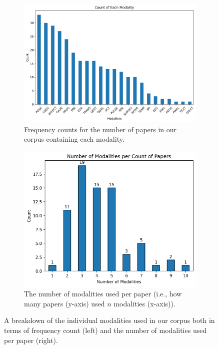\documentclass[manuscript,screen,review]{acmart}
\begin{document}
\begin{figure}[htbp]
    \centering    
    \begin{subfigure}[b]{0.45\textwidth}
        \includegraphics[width=\textwidth]{img/statistical_imgs/modalities.png}
        \caption{Frequency counts for the number of papers in our corpus containing each modality.}
        \label{fig:modalities_freq}
    \end{subfigure}
    \hfill
    \begin{subfigure}[b]{0.45\textwidth}
        \includegraphics[width=\textwidth]{img/statistical_imgs/number of modalities per count of papers.png}
        \caption{The number of modalities used per paper (i.e., how many papers (y-axis) used $n$ modalities (x-axis)).}
        \label{fig:modalities_nums}
    \end{subfigure}
    \caption{A breakdown of the individual modalities used in our corpus both in terms of frequency count (left) and the number of modalities used per paper (right).}
    \label{fig:modalities}
\end{figure}
\end{document}
